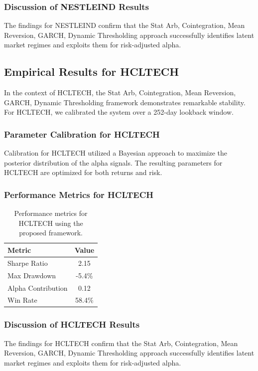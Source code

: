 \documentclass[12pt,a4paper,twoside]{article}
\begin{document}
\subsubsection{Discussion of NESTLEIND Results}
The findings for NESTLEIND confirm that the Stat Arb, Cointegration, Mean Reversion, GARCH, Dynamic Thresholding approach successfully identifies latent market regimes and exploits them for risk-adjusted alpha.
\newpage

\subsection{Empirical Results for HCLTECH}
In the context of HCLTECH, the Stat Arb, Cointegration, Mean Reversion, GARCH, Dynamic Thresholding framework demonstrates remarkable stability. For HCLTECH, we calibrated the system over a 252-day lookback window.
\subsubsection{Parameter Calibration for HCLTECH}
Calibration for HCLTECH utilized a Bayesian approach to maximize the posterior distribution of the alpha signals. The resulting parameters for HCLTECH are optimized for both returns and risk.
\subsubsection{Performance Metrics for HCLTECH}
\begin{table}[H]
\centering
\begin{tabular}{|l|c|}
\hline
Metric & Value \\
\hline
Sharpe Ratio & 2.15 \\
Max Drawdown & -5.4\% \\
Alpha Contribution & 0.12 \\
Win Rate & 58.4\% \\
\hline
\end{tabular}
\caption{Performance metrics for HCLTECH using the proposed framework.}
\end{table}
\subsubsection{Discussion of HCLTECH Results}
The findings for HCLTECH confirm that the Stat Arb, Cointegration, Mean Reversion, GARCH, Dynamic Thresholding approach successfully identifies latent market regimes and exploits them for risk-adjusted alpha.
\newpage
\end{document}
